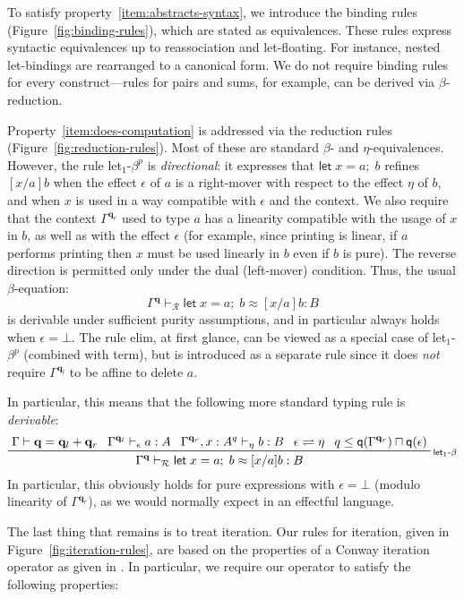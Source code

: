 \documentclass[acmsmall,screen,review]{acmart}
\newcommand{\mc}[1]{\ensuremath{\mathcal{#1}}}
\newcommand{\mb}[1]{\ensuremath{\mathbf{#1}}}
\newcommand{\ms}[1]{\ensuremath{\mathsf{#1}}}
\newcommand{\letexpr}[3]{\ensuremath{\ms{let}\;#1 = #2;\;#3}}
\newcommand{\qsp}[4]{#1 \vdash #2 = #3 + #4}
\newcommand{\rle}[1]{{\scriptsize\textsf{#1}}}
\newcommand{\hasty}[4]{#1 \vdash_{#2} #3: {#4}}
\newcommand{\teqv}{\approx}
\newcommand{\tmeq}[5]{#1 \vdash_{#2} #3 \teqv #4 : {#5}}
\newcommand{\brle}[1]{{\textsf{#1}}}
\newcommand{\slides}{\rightleftharpoons}
\newcommand{\alquant}{\ms{q}}
\begin{document}
To satisfy property~\ref{item:abstracts-syntax}, we introduce the binding rules
(Figure~\ref{fig:binding-rules}), which are stated as equivalences. These rules express syntactic
equivalences up to reassociation and let-floating. For instance, nested let-bindings are rearranged
to a canonical form. We do not require binding rules for every construct—rules for pairs and sums,
for example, can be derived via $\beta$-reduction.

Property~\ref{item:does-computation} is addressed via the reduction rules
(Figure~\ref{fig:reduction-rules}). Most of these are standard $\beta$- and $\eta$-equivalences.
However, the rule \brle{let$_1$-$\beta^p$} is \emph{directional}: it expresses that
$\letexpr{x}{a}{b}$ refines $[x/a]b$ when the effect $\epsilon$ of $a$ is a right-mover with respect
to the effect $\eta$ of $b$, and when $x$ is used in a way compatible with $\epsilon$ and the
context. We also require that the context $\Gamma^{\mb{q}_r}$ used to type $a$ has a linearity
compatible with the usage of $x$ in $b$, as well as with the effect $\epsilon$ (for example, since
printing is linear, if $a$ performs printing then $x$ must be used linearly in $b$ even if $b$ is
pure). The reverse direction is permitted only under the dual (left-mover) condition. Thus, the
usual $\beta$-equation:
\[
\tmeq{\Gamma^{\mb{q}}}{\mc{R}}{\letexpr{x}{a}{b}}{[x/a]b}{B}
\]
is derivable under sufficient purity assumptions, and in particular always holds when $\epsilon =
\bot$. 
%
The rule \brle{elim}, at first glance, can be viewed as a special case of \brle{let$_1$-$\beta^p$}
(combined with \brle{term}), but is introduced as a separate rule since it does \emph{not} require
$\Gamma^{\mb{q}_l}$ to be affine to delete $a$.

In particular, this means that the following more standard typing rule is \emph{derivable}:
\begin{equation}
  \prftree[r]{\rle{let$_1$-$\beta$}}
  {\qsp{\Gamma}{\mb{q}}{\mb{q}_l}{\mb{q}_r}}
  {\hasty{\Gamma^{\mb{q}_l}}{\epsilon}{a}{A}}
  {\hasty{\Gamma^{\mb{q}_r}, x : A^q}{\eta}{b}{B}}
  {\epsilon \slides \eta}
  {q \leq \alquant(\Gamma^{\mb{q}_r}) \sqcap \alquant(\epsilon)}
  {
    \tmeq{\Gamma^{\mb{q}}}{\mc{R}}{\letexpr{x}{a}{b}}{[x/a]b}{B}
  }
\end{equation}
In particular, this obviously holds for pure expressions with $\epsilon = \bot$ (modulo linearity of
$\Gamma^{\mb{q}_r}$), as we would normally expect in an effectful language.

The last thing that remains is to treat iteration. Our rules for iteration, given in
Figure~\ref{fig:iteration-rules}, are based on the properties of a Conway iteration operator as
given in \citet{coinductive-resumption-levy-goncharov-19}. In particular, we require our operator to
satisfy the following properties:
%
\end{document}
